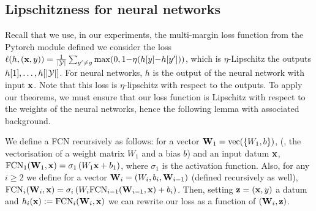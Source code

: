 \documentclass{article}
\begin{document}
\subsection{Lipschitzness for neural networks}
\label{sec:lip-nn}

Recall that we use, in our experiments, the multi-margin loss function from the Pytorch module defined we consider the loss $\ell(h, (\mathbf{x}, y)) = \frac{1}{|\mathcal{Y}|}\sum_{y'\ne y} \max(0, 1{-} \eta(h[y]{-}h[y']))$, which is $\eta$-Lipschitz \wrt the outputs $h[1],\dots, h[|\mathcal{Y}|]$.
For neural networks, $h$ is the output of the neural network with input $\mathbf{x}$. Note that this loss is $\eta$-lipschitz with respect to the outputs.
To apply our theorems, we must ensure that our loss function is Lipschitz with respect to the weights of the neural networks, hence the following lemma with associated background.

We define a FCN recursively as follows: for a vector $\mathbf{W}_1= \operatorname*{\mathrm{vec}}(\{W_1,b\})$, (\ie, the vectorisation of a weight matrix $W_1$ and a bias $b$) and an input datum $\mathbf{x}$, $\text{FCN}_1(\mathbf{W}_1, \mathbf{x})= \sigma_1\left(W_1\mathbf{x} +b_1  \right)$, where $\sigma_1$ is the activation function.
Also, for any $i\geq 2$ we define for a vector $\mathbf{W}_i= (W_{i},b_i,\mathbf{W}_{i-1})$ (defined recursively as well), $\text{FCN}_i(\mathbf{W}_{i},\mathbf{x})= \sigma_i\left(W_i\text{FCN}_{i-1}(\mathbf{W}_{i-1},\mathbf{x}) +b_i  \right)$.
Then, setting $\mathbf{z}=(\mathbf{x},y)$ a datum and  $h_i(\mathbf{x}) := \text{FCN}_i(\mathbf{W}_{i},\mathbf{x})$ we can rewrite our loss as a function of $(\mathbf{W}_{i},\mathbf{z})$. 
\end{document}
